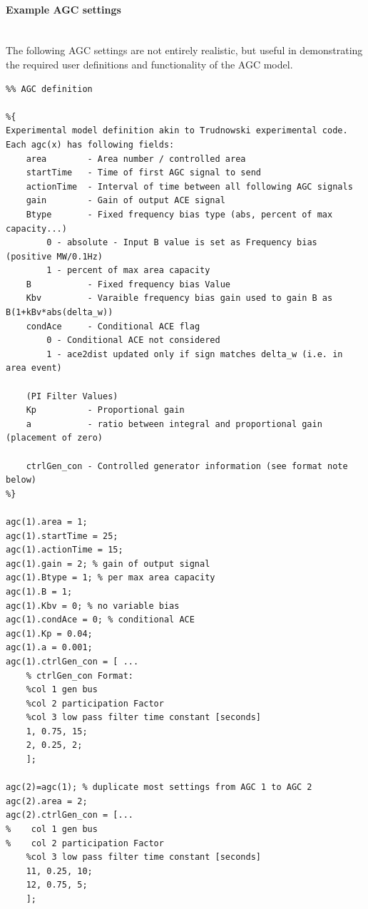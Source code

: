 \documentclass[12pt]{article}
\begin{document}
\paragraph{Example AGC settings} \ \\ 
The following AGC settings are not entirely realistic, but useful in demonstrating the required user definitions and functionality of the AGC model.

\begin{verbatim}
%% AGC definition

%{ 
Experimental model definition akin to Trudnowski experimental code.
Each agc(x) has following fields:
    area        - Area number / controlled area
    startTime   - Time of first AGC signal to send
    actionTime  - Interval of time between all following AGC signals
    gain        - Gain of output ACE signal
    Btype       - Fixed frequency bias type (abs, percent of max capacity...)
        0 - absolute - Input B value is set as Frequency bias (positive MW/0.1Hz)
        1 - percent of max area capacity
    B           - Fixed frequency bias Value
    Kbv         - Varaible frequency bias gain used to gain B as B(1+kBv*abs(delta_w))
    condAce     - Conditional ACE flag
        0 - Conditional ACE not considered
        1 - ace2dist updated only if sign matches delta_w (i.e. in area event)

    (PI Filter Values)
    Kp          - Proportional gain
    a           - ratio between integral and proportional gain (placement of zero)

    ctrlGen_con - Controlled generator information (see format note below)
%}

agc(1).area = 1;
agc(1).startTime = 25;
agc(1).actionTime = 15;
agc(1).gain = 2; % gain of output signal
agc(1).Btype = 1; % per max area capacity
agc(1).B = 1;
agc(1).Kbv = 0; % no variable bias
agc(1).condAce = 0; % conditional ACE
agc(1).Kp = 0.04;
agc(1).a = 0.001;
agc(1).ctrlGen_con = [ ...
    % ctrlGen_con Format:
    %col 1 gen bus
    %col 2 participation Factor
    %col 3 low pass filter time constant [seconds]
    1, 0.75, 15;
    2, 0.25, 2;
    ];

agc(2)=agc(1); % duplicate most settings from AGC 1 to AGC 2
agc(2).area = 2;
agc(2).ctrlGen_con = [...
%    col 1 gen bus
%    col 2 participation Factor
    %col 3 low pass filter time constant [seconds]
    11, 0.25, 10;
    12, 0.75, 5;
    ];
\end{verbatim}
\end{document}
